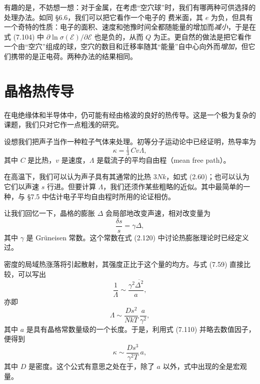 
有趣的是，不妨想一想：对于金属，在考虑“空穴球”时，我们有哪两种可供选择的处理办法。如同 §6.6，我们可以把它看作一个电子的 费米面，其 $e$ 为负，但具有一个奇特的性质：电子的面积、速度和弛豫时间全都随能量的增加而\emph{减小}，于是在式 (7.104) 中 $\partial\ln\sigma(\mathcal{E})/\partial\mathcal{E}$ 也是负的，从而 $Q$ 为正。更自然的做法是把它看作一个由“空穴”组成的球，空穴的数目和迁移率随其“能量”自中心向外而\emph{增加}，但它们携带的是正电荷。两种办法的结果相同。


\section{晶格热传导}

在电绝缘体和半导体中，仍可能有经由格波的良好的热传导。这是一个极为复杂的课题，我们只对它作一点粗浅的研究。

设想我们把声子当作一种粒子气体来处理。初等分子运动论中已经证明，热导率为
\begin{equation*}
\kappa=\tfrac{1}{3}\,Cv\Lambda,\tag{7.110}
\end{equation*}
其中 $C$ 是比热，$v$ 是速度，$\Lambda$ 是载流子的平均自由程（mean free path）。

在高温下，我们可以认为声子具有其通常的比热 $3Nk$，如式 (2.60)；也可以认为它们以声速 $s$ 行进。但要计算 $\Lambda$，我们还须作某些粗略的近似。其中最简单的一种，与 §7.5 中估计电子平均自由程时所用的论证相仿。

让我们回忆一下，晶格的膨胀 $\Delta$ 会局部地改变声速，相对改变量为
\begin{equation*}
\frac{\delta s}{s}=\gamma\Delta,\tag{7.111}
\end{equation*}
其中 $\gamma$ 是 Grüneisen 常数。这个常数在式 (2.120) 中讨论热膨胀理论时已经定义过。

密度的局域热涨落将引起散射，其强度正比于这个量的均方。与式 (7.59) 直接比较，可以写出
\begin{equation*}
\frac{1}{\Lambda}\sim\frac{\gamma^{2}\overline{\Delta^{2}}}{a},\tag{7.112}
\end{equation*}
亦即
\begin{equation*}
\Lambda\sim\frac{Ds^{2}}{NkT}\,\frac{a}{\gamma^{2}},\tag{7.113}
\end{equation*}
其中 $a$ 是具有晶格常数量级的一个长度。于是，利用式 (7.110) 并略去数值因子，便得到
\begin{equation*}
\kappa\sim\frac{Ds^{3}}{\gamma^{2}T}\,a,\tag{7.114}
\end{equation*}
其中 $D$ 是密度。这个公式有意思之处在于，除了 $a$ 以外，式中出现的全是宏观量。

